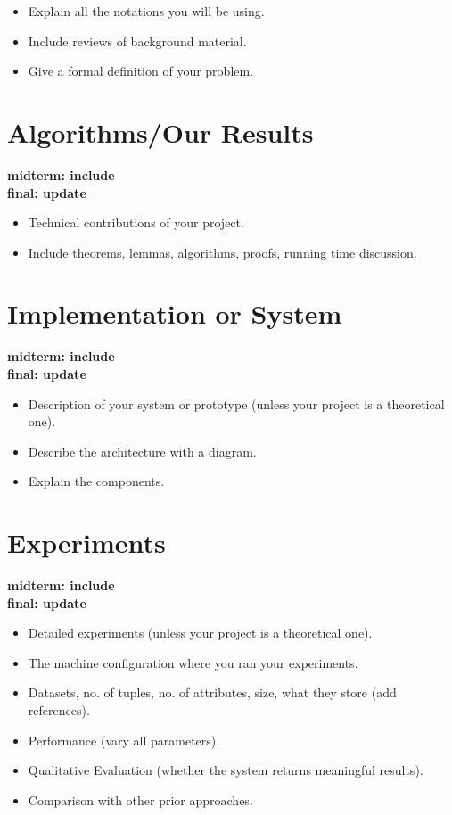 \documentclass[twocolumn]{article}
\newcommand{\red}[1]{{\bf \color{red}#1}}
\newcommand{\blue}[1]{{\bf \color{blue}#1}}
\begin{document}
\red{
\begin{itemize}
\itemsep0em
\item Explain all the notations you will be using.
\item Include reviews of background material.
\item Give a formal definition of your problem.
\end{itemize}
}


\section{Algorithms/Our Results}
\blue{
midterm: include\\
final: update\\
}

\red{
\begin{itemize}
\itemsep0em
\item Technical contributions of your project.
\item Include theorems, lemmas, algorithms, proofs, running time discussion.
\end{itemize}
}

\section{Implementation or System}
\blue{
midterm: include\\
final: update\\
}

\red{
\begin{itemize}
\itemsep0em
\item Description of your system or prototype (unless your project is a theoretical one).
\item Describe the architecture with a diagram.
\item Explain the components.
\end{itemize}
}


\section{Experiments}
\blue{
midterm: include\\
final: update\\
}

\red{
\begin{itemize}
\itemsep0em
\item Detailed experiments (unless your project is a theoretical one).
\item The machine configuration where you ran your experiments.
\item Datasets, no. of tuples, no. of attributes, size, what they store (add references).
\item Performance (vary all parameters).
\item Qualitative Evaluation (whether the system returns meaningful results).
\item Comparison with other prior approaches.
\end{itemize}
}
\end{document}
